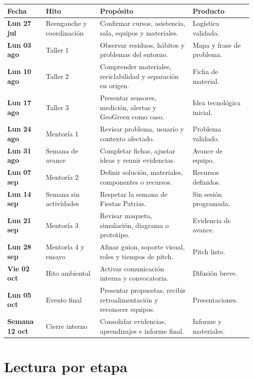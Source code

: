 \documentclass[10pt,a4paper]{article}
\newcommand{\datecell}[1]{\textbf{\textcolor{AIEPNavy}{#1}}}
\begin{document}
\begin{tabularx}{\textwidth}{@{}L{25mm}L{38mm}Y L{34mm}@{}}
\textbf{\color{AIEPNavy}Fecha} & \textbf{\color{AIEPNavy}Hito} & \textbf{\color{AIEPNavy}Propósito} & \textbf{\color{AIEPNavy}Producto} \\
\hline
\datecell{Lun 27 jul} & Reenganche y coordinación & Confirmar cursos, asistencia, sala, equipos y materiales. & Logística validada. \\
\datecell{Lun 03 ago} & Taller 1 & Observar residuos, hábitos y problemas del entorno. & Mapa y frase de problema. \\
\datecell{Lun 10 ago} & Taller 2 & Comprender materiales, reciclabilidad y separación en origen. & Ficha de material. \\
\datecell{Lun 17 ago} & Taller 3 & Presentar sensores, medición, alertas y GeoGreen como caso. & Idea tecnológica inicial. \\
\datecell{Lun 24 ago} & Mentoría 1 & Revisar problema, usuario y contexto afectado. & Problema validado. \\
\datecell{Lun 31 ago} & Semana de avance & Completar fichas, ajustar ideas y reunir evidencias. & Avance de equipo. \\
\datecell{Lun 07 sep} & Mentoría 2 & Definir solución, materiales, componentes o recursos. & Recursos definidos. \\
\datecell{Lun 14 sep} & Semana sin actividades & Respetar la semana de Fiestas Patrias. & Sin sesión programada. \\
\datecell{Lun 21 sep} & Mentoría 3 & Revisar maqueta, simulación, diagrama o prototipo. & Evidencia de avance. \\
\datecell{Lun 28 sep} & Mentoría 4 y ensayo & Afinar guion, soporte visual, roles y tiempos de pitch. & Pitch listo. \\
\datecell{Vie 02 oct} & Hito ambiental & Activar comunicación interna y convocatoria. & Difusión breve. \\
\datecell{Lun 05 oct} & Evento final & Presentar propuestas, recibir retroalimentación y reconocer equipos. & Presentaciones. \\
\datecell{Semana 12 oct} & Cierre interno & Consolidar evidencias, aprendizajes e informe final. & Informe y materiales. \\
\end{tabularx}

\newpage
\section{Lectura por etapa}
\end{document}
